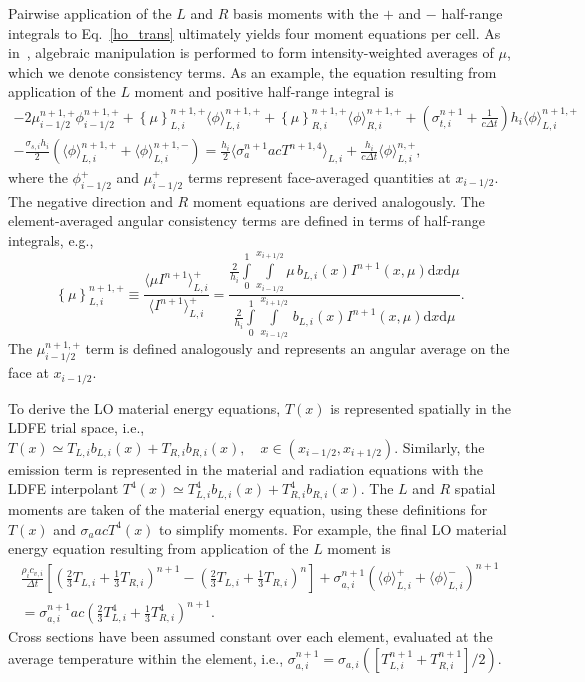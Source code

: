 \documentclass[11pt]{article}
\renewcommand{\d}{\mathrm{d}}
\newcommand{\mom}[1]{\langle #1 \rangle}
\newcommand{\cur}[1]{\left\{ #1 \right\}}
\newcommand{\xl}{{x_{i-1/2}}}
\newcommand{\xr}{{x_{i+1/2}}}
\newcommand{\il}{{i-1/2}}
\newcommand{\ir}{{i+1/2}}
\begin{document}
Pairwise application of the $L$ and $R$ basis
moments with the $+$ and $-$ half-range integrals to Eq.~\eqref{ho_trans} 
ultimately yields four moment
equations per cell. As in~\cite{wolters}, algebraic manipulation is performed to form
intensity-weighted
averages of $\mu$, which we denote consistency terms.  
As an example, the equation resulting from application of the $L$ moment and
positive half-range integral is
\begin{multline}\label{lo_tran}
    -2{\mu}_{i-1/2}^{n+1,+} \phi_{i-1/2}^{n+1,+} + \cur {\mu}_{L,i}^{n+1,+}
  \mom{\phi}_{L,i}^{n+1,+}
  +  \cur\mu_{R,i}^{n+1,+}
  \mom{\phi}_{R,i}^{n+1,+} +  \left(\sigma_{t,i}^{n+1}+\frac{1}{c \Delta t} \right) h_i 
  \mom{\phi}_{L,i}^{n+1,+} \\-  \frac{\sigma_{s,i} h_i}{2} \left( \mom{\phi}_{L,i}^{n+1,+} +
  \mom\phi_{L,i}^{n+1,-}\right) = \frac{h_i}{2} \mom{\sigma_a^{n+1} a c T^{n+1,4}}_{L,i} +
  \frac{h_i}{c\Delta t}\mom{\phi}_{L,i}^{n,+},
\end{multline}
where the $\phi^+_{i-1/2}$ and $\mu^+_{i-1/2}$ terms represent face-averaged quantities at $x_{\il}$.  The negative direction and $R$ moment equations are
derived analogously.  The element-averaged angular consistency terms are defined in terms of half-range integrals, e.g.,
\begin{equation}\label{const}
    \cur{{\mu}}_{L,i}^{n+1,+} \equiv \frac{\mom{\mu I^{n+1}}_{L,i}^+}{\mom{I^{n+1}}_{L,i}^+} =  \frac{
{\displaystyle \frac{2}{h_i}} \int\limits_0^1 \int\limits_\xl^\xr \mu \, b_{L,i}(x)
I^{n+1}(x,\mu) \d x \d \mu } 
{{\displaystyle \frac{2}{h_i}} \int\limits_0^1 \int\limits_\xl^\xr \, b_{L,i}(x)
I^{n+1}(x,\mu) \d x \d \mu } .
\end{equation}
The $\mu_{i-1/2}^{n+1,+}$ term is defined analogously and represents an angular average on the face at $x_{\il}$.

To derive the LO material energy equations, $T(x)$ is represented spatially in
the LDFE trial space, i.e.,
$ T(x) \simeq T_{L,i} b_{L,i}(x) + T_{R,i} b_{R,i}(x),\quad x\in(x_{i-1/2},x_\ir)$.
Similarly, the emission term is represented in the material and radiation equations with the LDFE
interpolant $T^4(x)\simeq T_{L,i}^4 b_{L,i}(x) + T_{R,i}^4 b_{R,i}(x)$.   The $L$ and $R$ spatial moments are taken of the material
energy equation, using these definitions for $T(x)$ and $\sigma_a a c T^4(x)$ to simplify moments. For example, the final LO material energy
 equation resulting from application of the $L$ moment is
 \begin{multline}\label{lo_mat_dis}
     \frac{\rho_i c_{v,i}}{\Delta t}\left[ \left(\frac{2}{3}T_{L,i} + \frac{1}{3}T_{R,i}
        \right)^{n+1} - \left(\frac{2}{3}T_{L,i} + \frac{1}{3}T_{R,i}
    \right)^{n} \right]  + \sigma_{a,i}^{n+1} \left( \mom{\phi}_{L,i}^+ +
    \mom{\phi}_{L,i}^- \right)^{n+1} \\ = \sigma_{a,i}^{n+1}a c
\left( \frac{2}{3} T_{L,i}^4 + \frac{1}{3}T_{R,i}^4
        \right)^{n+1}.
\end{multline}
Cross sections have been assumed constant over each element, evaluated at the
average temperature within the element, i.e., $\sigma_{a,i}^{n+1} =
\sigma_{a,i}([T^{n+1}_{L,i}+T^{n+1}_{R,i}]/2)$.
\end{document}
